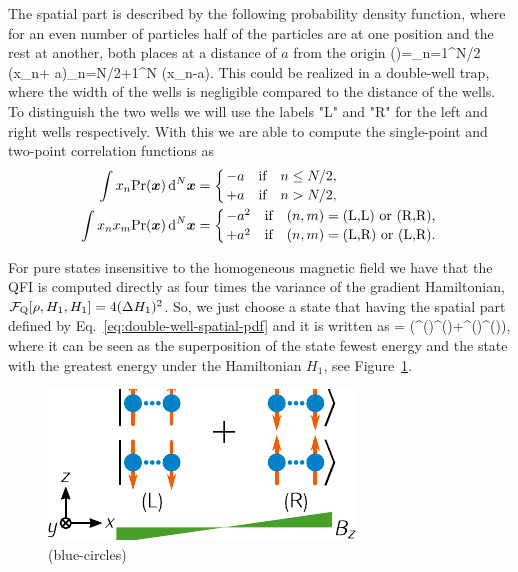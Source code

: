The spatial part is described by the following probability density function, where for an even number of particles half of the particles are at one position and the rest at another, both places at a distance of $a$ from the origin
\be
  \prob()=\prod_{n=1}^{N/2} \delta(x_n+ a)\prod_{n=N/2+1}^{N} \delta(x_n-a).
  \label{eq:double-well-spatial-pdf}
\ee
This could be realized in a double-well trap, where the width of the wells is negligible compared to the distance of the wells.
To distinguish the two wells we will use the labels "L" and "R" for the left and right wells respectively.
With this we are able to compute the single-point and two-point correlation functions as
\begin{align}
  \label{eq:single-point-function-double-well}
  \int  x_n\prob(\bs{x})\,\text{d}^N\bs{x} &= \lcor\ver{-a \quad \text{if} \quad n\leq N/2,}{+a \quad \text{if} \quad n>N/2,}\right. \\
  \label{eq:two-point-function-double-well}
  \int x_n x_m\prob(\bs{x})\,\text{d}^N\bs{x} &= \lcor\ver{-a^2 \quad \text{if} \quad (n,m)= \text{(L,L) or (R,R),}}{+a^2 \quad \text{if} \quad (n,m)= \text{(L,R) or (L,R).}} \right.
\end{align}

For pure states insensitive to the homogeneous magnetic field we have that the QFI is computed directly as four times the variance of the gradient Hamiltonian, $\mathcal{F}_{\textnormal{Q}}[{\textstyle \rho, H_1, H_1}]=4(\Delta H_1 )^2$.
So, we just choose a state that having the spatial part defined by Eq.~\eqref{eq:double-well-spatial-pdf} and it is written as
\be
  \label{eq:best-state}
  \ket{\Psi} = (^{()}^{()}+^{()}^{()}),
\ee
where it can be seen as the superposition of the state fewest energy and the state with the greatest energy under the Hamiltonian $H_1$, see Figure~\ref{fig:gm-double-well}.
\begin{figure}[htp]
  \begin{center}
    \includegraphics[scale=1.2]{img/GM_double_well.pdf}
    \caption[Best state in two-ensemble configuration]{(blue-circles)}
    \label{fig:gm-double-well}
  \end{center}
\end{figure}



